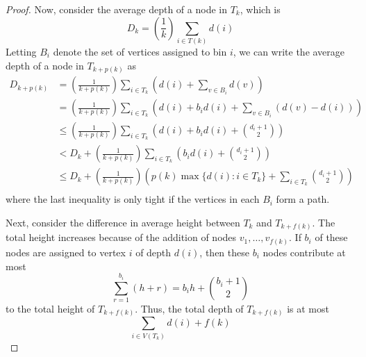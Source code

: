 \documentclass[lotsofwhite]{patmorin}
\begin{document}
\begin{proof}
  Now, consider the average depth of a node in $T_{k}$, which is
  \[
     D_k = \left(\frac{1}{k}\right)\sum_{i\in T(k)} d(i)
  \]
  Letting $B_i$ denote the set of vertices assigned to bin $i$,
  we can write the average depth of a node in $T_{k+p(k)}$ as
  \begin{align*}
      D_{k+p(k)} 
         & = \left(\frac{1}{k+p(k)}\right)\sum_{i\in T_k}\left(d(i) + \sum_{v\in B_i} d(v) \right) \\
         & = \left(\frac{1}{k+p(k)}\right)\sum_{i\in T_k}\left(d(i) + b_id(i) + \sum_{v\in B_i} (d(v)-d(i)) \right) \\
         & \le \left(\frac{1}{k+p(k)}\right)\sum_{i\in T_k}\left(d(i) + b_id(i) + \binom{d_i+1}{2}\right)  \\
         & < D_k + \left(\frac{1}{k+p(k)}\right)\sum_{i\in T_k}\left(b_id(i) + \binom{d_i+1}{2}\right)  \\
         & \le D_k + \left(\frac{1}{k+p(k)}\right)\left(p(k)\max\{d(i):i\in T_k\} + \sum_{i\in T_k}\binom{d_i+1}{2}\right)  \\
  \end{align*} 
  where the last inequality is only tight if the vertices in each $B_i$
  form a path.


  Next, consider the difference in average height between $T_{k}$
  and $T_{k+f(k)}$.  The total height increases because of the addition
  of nodes $v_1,\ldots,v_{f(k)}$.  If $b_i$ of these nodes are assigned to vertex $i$ of depth $d(i)$, then these $b_i$ nodes contribute at most
  \[  \sum_{r=1}^{b_i} \left(h+r\right) =  b_i h + \binom{b_{i}+1}{2} \]
  to the total height of $T_{k+f(k)}$.  Thus, the total depth of $T_{k+f(k)}$
  is at most
  \[
      \sum_{i\in V(T_k)} d(i) + f(k)
  \]

\end{proof}
\end{document}
